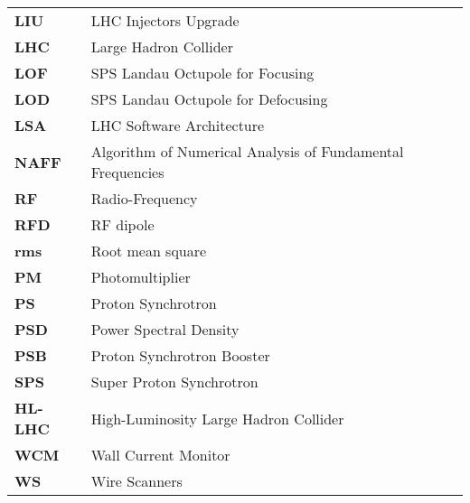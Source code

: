 \begin{flushleft}
  \begin{tabular}{l l}
  
\textbf{LIU} & \qquad\qquad\qquad LHC Injectors Upgrade \\
\textbf{LHC} & \qquad\qquad\qquad Large Hadron Collider \\

\textbf{LOF} & \qquad\qquad\qquad SPS Landau Octupole for Focusing \\
\textbf{LOD} & \qquad\qquad\qquad SPS Landau Octupole for Defocusing \\

\textbf{LSA} & \qquad\qquad\qquad LHC Software Architecture \\


\textbf{NAFF} & \qquad\qquad\qquad Algorithm of Numerical Analysis of Fundamental Frequencies \\

\textbf{RF} & \qquad\qquad\qquad Radio-Frequency \\
\textbf{RFD} & \qquad\qquad\qquad RF dipole \\
\textbf{rms} & \qquad\qquad\qquad Root mean square \\

\textbf{PM} & \qquad\qquad\qquad Photomultiplier \\
\textbf{PS} & \qquad\qquad\qquad Proton Synchrotron \\
\textbf{PSD} & \qquad\qquad\qquad Power Spectral Density \\
\textbf{PSB} & \qquad\qquad\qquad Proton Synchrotron Booster \\
\textbf{SPS} & \qquad\qquad\qquad Super Proton Synchrotron \\


\textbf{HL-LHC} & \qquad\qquad\qquad High-Luminosity Large Hadron Collider \\

\textbf{WCM} & \qquad\qquad\qquad Wall Current Monitor \\
\textbf{WS} & \qquad\qquad\qquad Wire Scanners \\



\end{tabular}
\end{flushleft}



